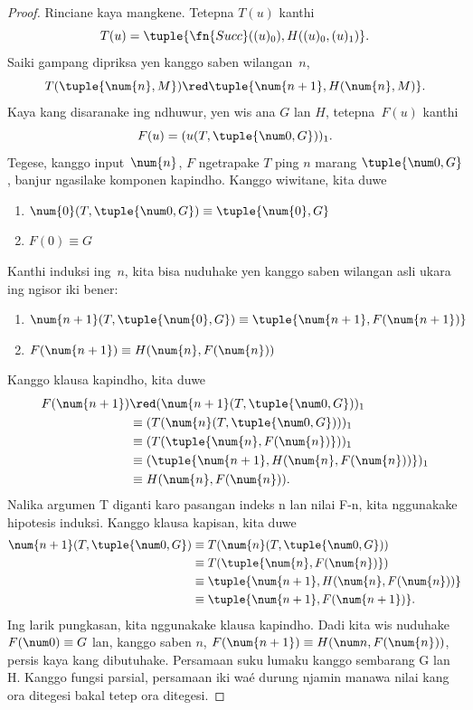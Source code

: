 \documentclass[../../../include/open-logic-section]{subfiles}
\begin{document}
\begin{proof}
Rinciane kaya mangkene. Tetepna $T(u)$
kanthi
\[
T(u) = \tuple{\fn{Succ}((u)_0), H((u)_0,(u)_1)}.
\]
Saiki gampang dipriksa yen kanggo saben
wilangan~$n$,
\[
T(\tuple{\num{n}, M}) \red \tuple{\num{n+1}, H(\num{n}, M)}.
\]
Kaya kang disaranake ing ndhuwur, yen
wis ana $G$ lan $H$, tetepna~$F(u)$
kanthi
\[
F(u) = (u(T,\tuple{\num 0, G}))_1.
\]
Tegese, kanggo input~$\num{n}$,
$F$ ngetrapake $T$ ping $n$ marang
$\tuple{\num 0, G}$, banjur ngasilake
komponen kapindho. Kanggo wiwitane,
kita duwe
\begin{enumerate}
\item $\num{0} (T, \tuple{\num 0, G}) \equiv \tuple{\num{0}, G}$
\item $F(\num{0}) \equiv G$
\end{enumerate}
Kanthi induksi ing~$n$, kita bisa
nuduhake yen kanggo saben wilangan asli
ukara ing ngisor iki bener:
\begin{enumerate}
\item $\num{n+1}(T, \tuple{\num{0}, G}) \equiv \tuple{\num{n+1}, F(\num{n+1})}$
\item $F(\num{n+1}) \equiv H(\num{n}, F(\num{n}))$
\end{enumerate}
Kanggo klausa kapindho, kita duwe
\begin{align*}
F(\num{n+1}) & \red (\num{n+1}(T, \tuple{\num 0, G}))_1 \\
& \equiv (T(\num{n} (T, \tuple{\num 0, G})))_1 \\
& \equiv (T(\tuple{\num{n}, F(\num{n})}))_1 \\
& \equiv (\tuple{\num{n+1}, H(\num{n}, F(\num{n}))})_1 \\
& \equiv H(\num{n}, F(\num{n})).
\end{align*}
Nalika argumen T diganti karo pasangan indeks n lan nilai F-n,
kita nggunakake hipotesis induksi.
Kanggo klausa kapisan, kita duwe
\begin{align*}
\num{n+1} (T, \tuple{\num 0, G}) &
\equiv T(\num{n} (T, \tuple{\num 0, G})) \\
& \equiv T( \tuple{\num{n}, F(\num{n})}) \\
& \equiv \tuple{\num{n+1}, H(\num{n}, F(\num{n}))} \\
& \equiv \tuple{\num{n+1}, F(\num{n+1})}.
\end{align*}
Ing larik pungkasan, kita nggunakake
klausa kapindho. Dadi kita wis nuduhake
$F(\num 0) \equiv G$ lan, kanggo saben
$n$, $F(\num {n+1}) \equiv H(\num
n, F(\num{n}))$, persis kaya kang
dibutuhake. Persamaan suku lumaku kanggo sembarang G lan H. Kanggo fungsi parsial, persamaan iki waé durung njamin manawa nilai kang ora ditegesi bakal tetep ora ditegesi.
\end{proof}
\end{document}

